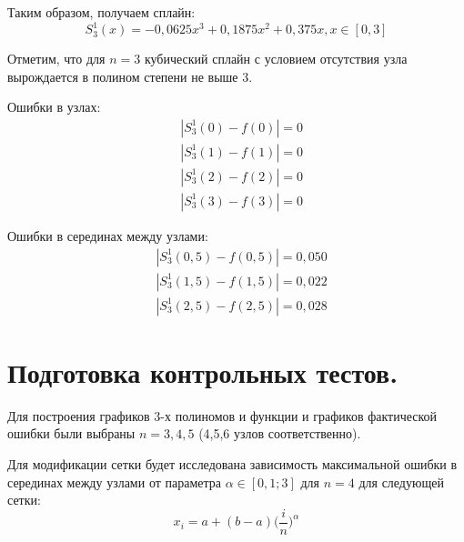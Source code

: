 \documentclass[a4paper, 12pt]{article}
\begin{document}
	Таким образом, получаем сплайн:
	\begin{equation*}
		S_3^1(x)=-0,0625x^3+0,1875x^2+0,375x, x\in[0,3]
	\end{equation*}

	Отметим, что для $n=3$ кубический сплайн с условием отсутствия узла вырождается в полином степени не выше 3.
	
	Ошибки в узлах:
	\begin{equation*}
		\begin{aligned}
			&|S_3^1(0)-f(0)|=0\\
			&|S_3^1(1)-f(1)|=0\\
			&|S_3^1(2)-f(2)|=0\\
			&|S_3^1(3)-f(3)|=0
		\end{aligned}
	\end{equation*}

	Ошибки в серединах между узлами:
	\begin{equation*}
		\begin{aligned}
			&|S_3^1(0,5)-f(0,5)|=0,050\\
			&|S_3^1(1,5)-f(1,5)|=0,022\\
			&|S_3^1(2,5)-f(2,5)|=0,028
		\end{aligned}
	\end{equation*}
	
	\section{Подготовка контрольных тестов.}
	
    Для построения графиков 3-х полиномов и функции и графиков фактической ошибки были выбраны $n=3,4,5$ (4,5,6 узлов соответственно).
	
	Для модификации сетки будет исследована зависимость максимальной ошибки в серединах между узлами от параметра $\alpha\in[0,1;3]$ для $n=4$ для следующей сетки:
    \begin{equation} \label{grid}
    	x_i=a+(b-a)\bigg(\frac{i}{n}\bigg)^\alpha
    \end{equation}
	
\end{document}
